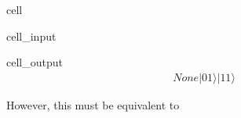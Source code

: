\documentclass[letterpaper,10pt,english]{jupyterBook}
\begin{document}
\begin{sphinxuseclass}{cell}\begin{sphinxVerbatimInput}

\begin{sphinxuseclass}{cell_input}
\begin{sphinxVerbatim}[commandchars=\\\{\}]
   
\end{sphinxVerbatim}

\end{sphinxuseclass}\end{sphinxVerbatimInput}
\begin{sphinxVerbatimOutput}

\begin{sphinxuseclass}{cell_output}\begin{equation*}
\begin{split}None |01\rangle |11\rangle\end{split}
\end{equation*}
\end{sphinxuseclass}\end{sphinxVerbatimOutput}

\end{sphinxuseclass}
\sphinxAtStartPar
However, this must be equivalent to
\end{document}
